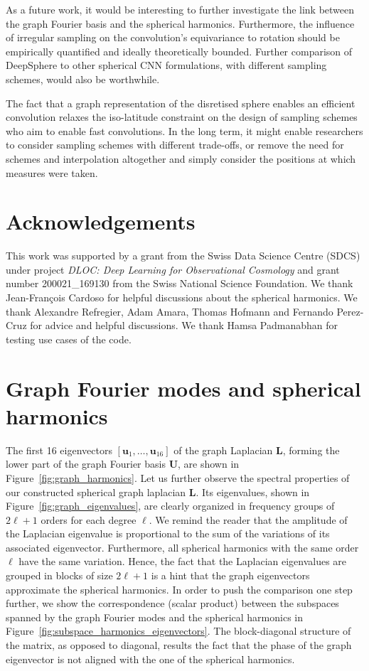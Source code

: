 \documentclass[final,twocolumn,3p,times,sort&compress]{elsarticle}
\newcommand{\figref}[1]{Figure~\ref{fig:#1}}
\renewcommand{\b}[1]{{\bm{#1}}}   %
\newcommand{\1}{\b{1}}              %
\newcommand{\0}{\b{0}}              %
\renewcommand{\L}{\b{L}}
\newcommand{\U}{\b{U}}
\begin{document}
As a future work, it would be interesting to further investigate the link between the graph Fourier basis and the spherical harmonics.
Furthermore, the influence of irregular sampling on the convolution's equivariance to rotation should be empirically quantified and ideally theoretically bounded.
Further comparison of DeepSphere to other spherical CNN formulations, with different sampling schemes, would also be worthwhile.

The fact that a graph representation of the disretised sphere enables an efficient convolution relaxes the iso-latitude constraint on the design of sampling schemes who aim to enable fast convolutions.
In the long term, it might enable researchers to consider sampling schemes with different trade-offs, or remove the need for schemes and interpolation altogether and simply consider the positions at which measures were taken.

\section*{Acknowledgements}

This work was supported by a grant from the Swiss Data Science Centre (SDCS) under project \textit{DLOC:  Deep Learning for Observational Cosmology} and grant number 200021\_169130 from the Swiss National Science Foundation.
We thank Jean-François Cardoso for helpful discussions about the spherical harmonics.
We thank Alexandre Refregier, Adam Amara, Thomas Hofmann and Fernando Perez-Cruz for advice and helpful discussions.
We thank Hamsa Padmanabhan for testing use cases of the code.

\appendix

\section{Graph Fourier modes and spherical harmonics}
\label{sec:comparison_spherical_harmonics}
The first 16 eigenvectors $[\b u_1, \ldots, \b u_{16}]$ of the graph Laplacian $\L$, forming the lower part of the graph Fourier basis $\U$, are shown in \figref{graph_harmonics}.
Let us further observe the spectral properties of our constructed spherical graph laplacian $\L$.
Its eigenvalues, shown in \figref{graph_eigenvalues}, are clearly organized in frequency groups of $2\ell + 1$ orders for each degree $\ell$.
We remind the reader that the amplitude of the Laplacian eigenvalue is proportional to the sum of the variations of its associated eigenvector. Furthermore, all spherical harmonics with the same order $\ell$ have the same variation. Hence, the fact that the Laplacian eigenvalues are grouped in blocks of size $2\ell + 1$ is a hint that the graph eigenvectors approximate the spherical harmonics.
In order to push the comparison one step further, we show the correspondence (scalar product) between the subspaces spanned by the graph Fourier modes and the spherical harmonics in \figref{subspace_harmonics_eigenvectors}.
The block-diagonal structure of the matrix, as opposed to diagonal, results the fact that the phase of the graph eigenvector is not aligned with the one of the spherical harmonics.
\end{document}
